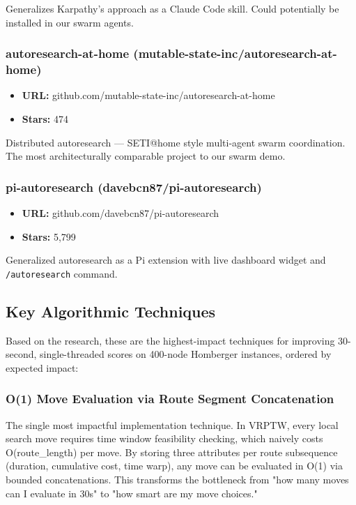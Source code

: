 \documentclass[twocolumn,10pt,letterpaper]{article}
\begin{document}
Generalizes Karpathy's approach as a Claude Code skill. Could potentially be installed in our swarm agents.


\subsubsection{autoresearch-at-home (mutable-state-inc/autoresearch-at-home)}

\begin{itemize}
\setlength{\itemsep}{0pt}
\setlength{\parskip}{0pt}
  \item \textbf{URL:} github.com/mutable-state-inc/autoresearch-at-home
  \item \textbf{Stars:} 474
\end{itemize}

Distributed autoresearch --- SETI@home style multi-agent swarm coordination. The most architecturally comparable project to our swarm demo.


\subsubsection{pi-autoresearch (davebcn87/pi-autoresearch)}

\begin{itemize}
\setlength{\itemsep}{0pt}
\setlength{\parskip}{0pt}
  \item \textbf{URL:} github.com/davebcn87/pi-autoresearch
  \item \textbf{Stars:} 5,799
\end{itemize}

Generalized autoresearch as a Pi extension with live dashboard widget and \texttt{/\allowbreak autoresearch} command.


\subsection{Key Algorithmic Techniques}

Based on the research, these are the highest-impact techniques for improving 30-second, single-threaded scores on 400-node Homberger instances, ordered by expected impact:


\subsubsection{O(1) Move Evaluation via Route Segment Concatenation}

The single most impactful implementation technique. In VRPTW, every local search move requires time window feasibility checking, which naively costs O(route\_length) per move. By storing three attributes per route subsequence (duration, cumulative cost, time warp), any move can be evaluated in O(1) via bounded concatenations. This transforms the bottleneck from "how many moves can I evaluate in 30s" to "how smart are my move choices."
\end{document}
